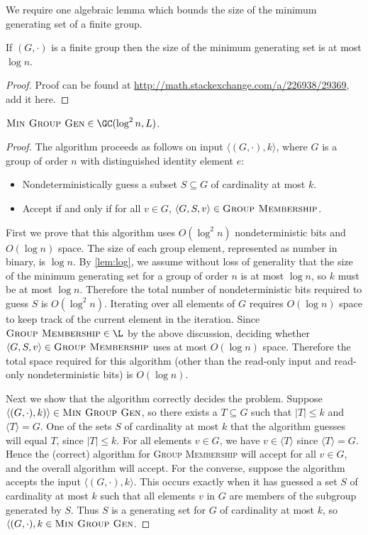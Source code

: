 \documentclass{article}
\newcommand{\gen}[1]{{\langle #1 \rangle}}
\begin{document}
We require one algebraic lemma which bounds the size of the minimum generating set of a finite group.

\begin{lemma}\label{lem:log}
  If $(G, \cdot)$ is a finite group then the size of the minimum generating set is at most $\log n$.
\end{lemma}
\begin{proof}
  Proof can be found at \url{http://math.stackexchange.com/a/226938/29369}, add it here.
\end{proof}

\begin{lemma}\label{lem:mingengc}
  $\textsc{Min Group Gen} \in \GC(\log^2 n, L)$.
\end{lemma}
\begin{proof}
  The algorithm proceeds as follows on input $\langle (G, \cdot), k \rangle$, where $G$ is a group of order $n$ with distinguished identity element $e$:
  \begin{itemize}
  \item Nondeterministically guess a subset $S \subseteq G$ of cardinality at most $k$.
  \item Accept if and only if for all $v \in G$, $\langle G, S, v \rangle \in \textsc{Group Membership}$.
  \end{itemize}

  First we prove that this algorithm uses $O(\log^2 n)$ nondeterministic bits and $O(\log n)$ space.
  The size of each group element, represented as number in binary, is $\log n$.
  By \autoref{lem:log}, we assume without loss of generality that the size of the minimum generating set for a group of order $n$ is at most $\log n$, so $k$ must be at most $\log n$.
  Therefore the total number of nondeterministic bits required to guess $S$ is $O(\log^2 n)$.
  Iterating over all elements of $G$ requires $O(\log n)$ space to keep track of the current element in the iteration.
  Since $\textsc{Group Membership} \in \L$ by the above discussion, deciding whether $\langle G, S, v \rangle \in \textsc{Group Membership}$ uses at most $O(\log n)$ space.
  Therefore the total space required for this algorithm (other than the read-only input and read-only nondeterministic bits) is $O(\log n)$.

  Next we show that the algorithm correctly decides the problem.
  Suppose $\langle (G, \cdot), k) \rangle \in \textsc{Min Group Gen}$, so there exists a $T \subseteq G$ such that $|T| \leq k$ and $\gen{T} = G$.
  One of the sets $S$ of cardinality at most $k$ that the algorithm guesses will equal $T$, since $|T| \leq k$.
  For all elements $v \in G$, we have $v \in \gen{T}$ since $\gen{T} = G$.
  Hence the (correct) algorithm for \textsc{Group Membership} will accept for all $v \in G$, and the overall algorithm will accept.
  For the converse, suppose the algorithm accepts the input $\langle (G, \cdot), k \rangle$.
  This occurs exactly when it has guessed a set $S$ of cardinality at most $k$ such that all elements $v$ in $G$ are members of the subgroup generated by $S$.
  Thus $S$ is a generating set for $G$ of cardinality at most $k$, so $\langle (G, \cdot), k \in \textsc{Min Group Gen}$.
\end{proof}
\end{document}
